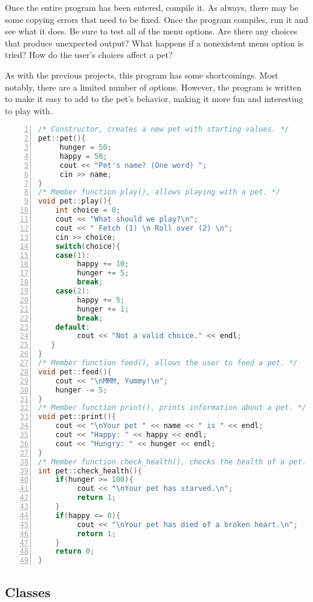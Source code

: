 Once the entire program has been entered, compile it.  As always, there may be some copying errors that need to be fixed.  Once the program compiles, run it and see what it does.  Be sure to test all of the menu options.  Are there any choices that produce unexpected output?  What happens if a nonexistent menu option is tried?  How do the user's choices affect a pet?

As with the previous projects, this program has some shortcomings.  Most notably, there are a limited number of options.  However, the program is written to make it easy to add to the pet's behavior, making it more fun and interesting to play with.  


\begin{minipage}{\textwidth}
\renewcommand*\thelstnumber{\the\value{lstnumber}b}
\begin{lstlisting}[language=C++,numbers = left,xleftmargin=4.0ex, basicstyle=\small, emph={hunger, happy,name,pet1,choice,health_check},emphstyle = \color{\mycolor},
showstringspaces=false,
caption = {Definition of the functions of the \cf{pet} class.},
label={listing:pet class}]
/* Constructor, creates a new pet with starting values. */
pet::pet(){
     hunger = 50;
     happy = 50;
     cout << "Pet's name? (One word) ";
     cin >> name;
}
/* Member function play(), allows playing with a pet. */
void pet::play(){
    int choice = 0;
    cout << "What should we play?\n";
    cout << " Fetch (1) \n Roll over (2) \n";
    cin >> choice;
    switch(choice){
    case(1):
         happy += 10;
         hunger += 5;
         break;
    case(2):
         happy += 5;
         hunger += 1;
         break;
    default:
         cout << "Not a valid choice." << endl;
   }
}
/* Member function feed(), allows the user to feed a pet. */
void pet::feed(){
    cout << "\nMMM, Yummy!\n";
    hunger -= 5;
}
/* Member function print(), prints information about a pet. */
void pet::print(){
    cout << "\nYour pet " << name << " is " << endl;
    cout << "Happy: " << happy << endl;
    cout << "Hungry: " << hunger << endl;
}
/* Member function check_health(), checks the health of a pet. */
int pet::check_health(){
    if(hunger >= 100){
         cout << "\nYour pet has starved.\n";
         return 1;
    }
    if(happy <= 0){
         cout << "\nYour pet has died of a broken heart.\n";
         return 1;
    }
    return 0;
}
\end{lstlisting}
\end{minipage}

\subsection{Classes}


